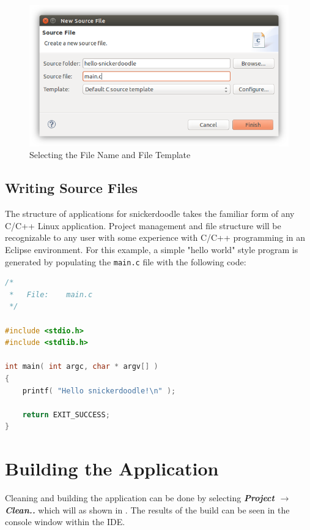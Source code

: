 \begin{figure}[h!]
	\centering
	\includegraphics{images/New_Main.png}
	\caption{Selecting the File Name and File Template}
\end{figure}

\subsection{Writing Source Files}
The structure of applications for snickerdoodle takes the familiar form of any C/C++ Linux application. Project management and file structure will be recognizable to any user with some experience with C/C++ programming in an Eclipse environment. For this example, a simple "hello world" style program is generated by populating the \texttt{main.c} file with the following code: \\

\begin{lstlisting}[language=c]
/*
 *   File:    main.c
 */

#include <stdio.h>
#include <stdlib.h>

int main( int argc, char * argv[] )
{
    printf( "Hello snickerdoodle!\n" );

    return EXIT_SUCCESS;
}
\end{lstlisting}


\section{Building the Application}

Cleaning and building the application can be done by selecting \textit{\bfseries Project $\rightarrow$ Clean..} which will  as shown in . The results of the build can be seen in the console window within the IDE. \\

